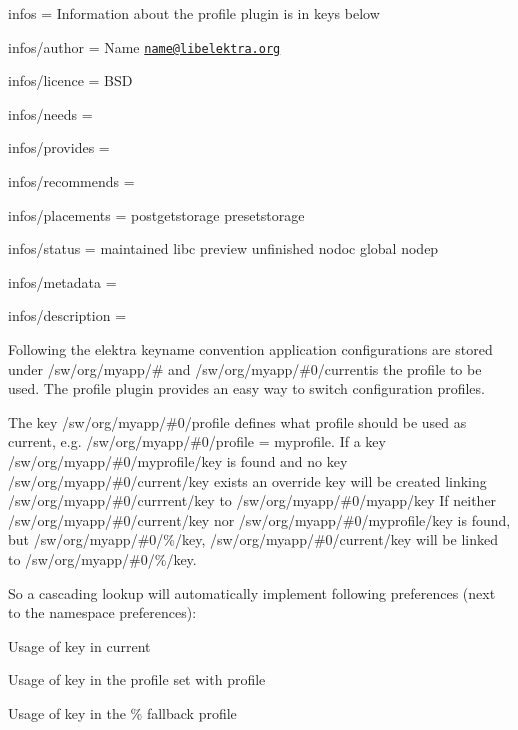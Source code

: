 
\begin{DoxyItemize}
\item infos = Information about the profile plugin is in keys below
\item infos/author = Name \href{mailto:name@libelektra.org}{\tt name@libelektra.\+org}
\item infos/licence = B\+S\+D
\item infos/needs =
\item infos/provides =
\item infos/recommends =
\item infos/placements = postgetstorage presetstorage
\item infos/status = maintained libc preview unfinished nodoc global nodep
\item infos/metadata =
\item infos/description =
\end{DoxyItemize}

Following the elektra keyname convention application configurations are stored under {\ttfamily /sw/org/myapp/\#} and {\ttfamily /sw/org/myapp/\#0/current}is the profile to be used. The {\ttfamily profile} plugin provides an easy way to switch configuration profiles.

The key {\ttfamily /sw/org/myapp/\#0/profile} defines what profile should be used as {\ttfamily current}, e.\+g. {\ttfamily /sw/org/myapp/\#0/profile = myprofile}. If a key {\ttfamily /sw/org/myapp/\#0/myprofile/key} is found and no key {\ttfamily /sw/org/myapp/\#0/current/key} exists an override key will be created linking {\ttfamily /sw/org/myapp/\#0/currrent/key} to {\ttfamily /sw/org/myapp/\#0/myapp/key} If neither {\ttfamily /sw/org/myapp/\#0/current/key} nor {\ttfamily /sw/org/myapp/\#0/myprofile/key} is found, but {\ttfamily /sw/org/myapp/\#0/\%/key}, {\ttfamily /sw/org/myapp/\#0/current/key} will be linked to {\ttfamily /sw/org/myapp/\#0/\%/key}.

So a cascading lookup will automatically implement following preferences (next to the namespace preferences)\+:


\begin{DoxyEnumerate}
\item Usage of key in {\ttfamily current}
\item Usage of key in the profile set with {\ttfamily profile}
\item Usage of key in the {\ttfamily \%} fallback profile
\end{DoxyEnumerate}

